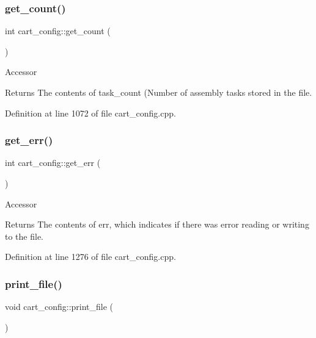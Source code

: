 \subsubsection{\texorpdfstring{get\+\_\+count()}{get\_count()}}
{\footnotesize\ttfamily int cart\+\_\+config\+::get\+\_\+count (\begin{DoxyParamCaption}{ }\end{DoxyParamCaption})}

Accessor \begin{DoxyReturn}{Returns}
The contents of task\+\_\+count (Number of assembly tasks stored in the file. 
\end{DoxyReturn}


Definition at line 1072 of file cart\+\_\+config.\+cpp.

\mbox{\label{classcart__config_a4a9bcdd8b2ca21ea2a8622923aa32ea2}} 
\subsubsection{\texorpdfstring{get\+\_\+err()}{get\_err()}}
{\footnotesize\ttfamily int cart\+\_\+config\+::get\+\_\+err (\begin{DoxyParamCaption}{ }\end{DoxyParamCaption})}

Accessor \begin{DoxyReturn}{Returns}
The contents of err, which indicates if there was error reading or writing to the file. 
\end{DoxyReturn}


Definition at line 1276 of file cart\+\_\+config.\+cpp.

\mbox{\label{classcart__config_ae51db45ded29529cbb52878fddc001f7}} 
\subsubsection{\texorpdfstring{print\+\_\+file()}{print\_file()}}
{\footnotesize\ttfamily void cart\+\_\+config\+::print\+\_\+file (\begin{DoxyParamCaption}{ }\end{DoxyParamCaption})}

